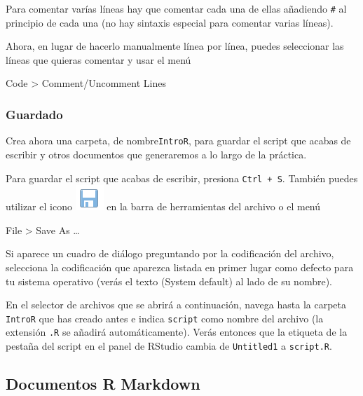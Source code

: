 \documentclass[
  title=normal,
  notoc,
  bib=normal]{mnye}
\begin{document}
\begin{infobox}

Para comentar varías líneas hay que comentar cada una de ellas añadiendo \texttt{\#} al principio de cada una (no hay sintaxis especial para comentar varias líneas).

Ahora, en lugar de hacerlo manualmente línea por línea, puedes seleccionar las líneas que quieras comentar y usar el menú

\begin{menu}
Code \textgreater{} Comment/Uncomment Lines

\end{menu}

\end{infobox}

\hypertarget{guardado}{%
\subsubsection{Guardado}\label{guardado}}

Crea ahora una carpeta, de nombre\texttt{IntroR}, para guardar el script que acabas de escribir y otros documentos que generaremos a lo largo de la práctica.

Para guardar el script que acabas de escribir, presiona \texttt{Ctrl\ +\ S}. También puedes utilizar el icono \includegraphics{images/save.png} en la barra de herramientas del archivo o el menú

\begin{menu}
File \textgreater{} Save As \ldots{}

\end{menu}

Si aparece un cuadro de diálogo preguntando por la codificación del archivo, selecciona la codificación que aparezca listada en primer lugar como defecto para tu sistema operativo (verás el texto (System default) al lado de su nombre).

En el selector de archivos que se abrirá a continuación, navega hasta la carpeta \texttt{IntroR} que has creado antes e indica \texttt{script} como nombre del archivo (la extensión \texttt{.R} se añadirá automáticamente). Verás entonces que la etiqueta de la pestaña del script en el panel de \textsf{RStudio} cambia de \texttt{Untitled1} a \texttt{script.R}.

\hypertarget{documentos-r-markdown}{%
\subsection{Documentos R Markdown}\label{documentos-r-markdown}}
\end{document}
